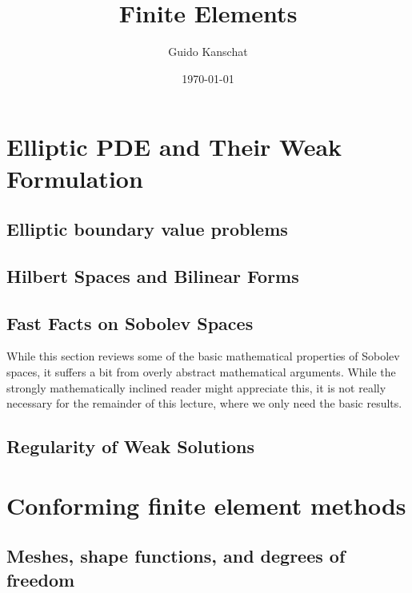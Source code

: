 \usepackage[notref,notcite]{showkeys}
\usepackage{tikz}
\usetikzlibrary{svg.path}


\def\constref#1{C_{\text{\ref{#1}}}}
\title{Finite Elements}
\author{Guido Kanschat}
\date{\today}


\maketitle
\tableofcontents
\chapter{Elliptic PDE and Their Weak Formulation}
\section{Elliptic boundary value problems}


\section{Hilbert Spaces and Bilinear Forms}


\section{Fast Facts on Sobolev Spaces}

\begin{intro}
  While this section reviews some of the basic mathematical properties
  of Sobolev spaces, it suffers a bit from overly abstract
  mathematical arguments. While the strongly mathematically inclined
  reader might appreciate this, it is not really necessary for the
  remainder of this lecture, where we only need the basic results.
\end{intro}


\section{Regularity of Weak Solutions}


\chapter{Conforming finite element methods}
\section{Meshes, shape functions, and degrees of freedom}

